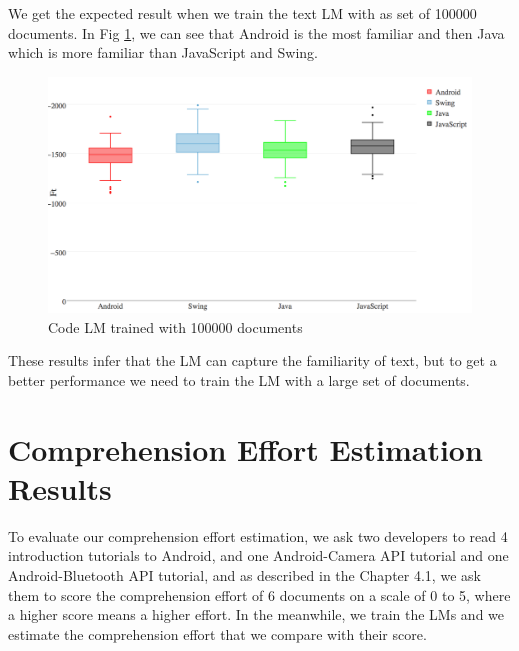 \documentclass[12pt,mscthesis]{usiinfthesis}
\begin{document}
{We get the expected result when we train the text LM with as set of 100000 documents. In Fig \ref{text100000}, we can see that Android is the most familiar and then Java which is more familiar than JavaScript and Swing.
\begin{figure}[H]
			\centering
			\includegraphics[width=\textwidth]{text100000}
			\caption{Code LM trained with 100000 documents}
			\label{text100000}
\end{figure}
These results infer that the LM can capture the familiarity of text, but to get a better performance we need to train the LM with a large set of documents.

\section{Comprehension Effort Estimation Results}

To evaluate our comprehension effort estimation, we ask two developers to read 4 introduction tutorials to Android, and one Android-Camera API tutorial and one Android-Bluetooth API tutorial, and as described in the Chapter 4.1, we ask them to score the comprehension effort of 6 documents on a scale of 0 to 5, where a higher score means a higher effort. In the meanwhile, we train the LMs and we estimate the comprehension effort that we compare with their score. 



}
\end{document}
